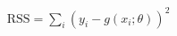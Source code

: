 \documentclass[10pt]{article}
\begin{document}
\begin{align*}\mathrm{RSS} = \sum_i \left(y_i - g\left(x_i;\theta\right)\right)^2\end{align*}
\end{document}
